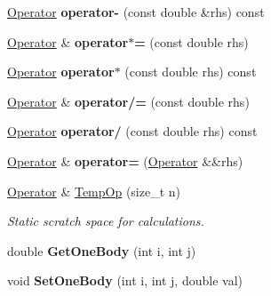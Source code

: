 \begin{DoxyCompactItemize}
\item 
\hyperlink{classOperator}{Operator} {\bfseries operator-\/} (const double \&rhs) const \hypertarget{classOperator_ab608309d2c25a2cabd0a65e9ac7dbc4d}{}\label{classOperator_ab608309d2c25a2cabd0a65e9ac7dbc4d}

\item 
\hyperlink{classOperator}{Operator} \& {\bfseries operator$\ast$=} (const double rhs)\hypertarget{classOperator_a9398ce826d8ef57e69a1aa776734080f}{}\label{classOperator_a9398ce826d8ef57e69a1aa776734080f}

\item 
\hyperlink{classOperator}{Operator} {\bfseries operator$\ast$} (const double rhs) const \hypertarget{classOperator_a0eeafc807e6ef6e3d30810f114e249bb}{}\label{classOperator_a0eeafc807e6ef6e3d30810f114e249bb}

\item 
\hyperlink{classOperator}{Operator} \& {\bfseries operator/=} (const double rhs)\hypertarget{classOperator_a53af250702ec7c48de5397b209ebc09e}{}\label{classOperator_a53af250702ec7c48de5397b209ebc09e}

\item 
\hyperlink{classOperator}{Operator} {\bfseries operator/} (const double rhs) const \hypertarget{classOperator_a60c6e3fa8da186a1183e540e6ff04421}{}\label{classOperator_a60c6e3fa8da186a1183e540e6ff04421}

\item 
\hyperlink{classOperator}{Operator} \& {\bfseries operator=} (\hyperlink{classOperator}{Operator} \&\&rhs)\hypertarget{classOperator_ab1d24f45c7e10139e41084c8dc7f34ec}{}\label{classOperator_ab1d24f45c7e10139e41084c8dc7f34ec}

\item 
\hyperlink{classOperator}{Operator} \& \hyperlink{classOperator_a868fc1cfa77af585baaefe7cbd7d76e5}{Temp\+Op} (size\+\_\+t n)\hypertarget{classOperator_a868fc1cfa77af585baaefe7cbd7d76e5}{}\label{classOperator_a868fc1cfa77af585baaefe7cbd7d76e5}

\begin{DoxyCompactList}\small\item\em Static scratch space for calculations. \end{DoxyCompactList}\item 
double {\bfseries Get\+One\+Body} (int i, int j)\hypertarget{classOperator_a34eb5fa0e6d415cd44e1a3034d1cf5c0}{}\label{classOperator_a34eb5fa0e6d415cd44e1a3034d1cf5c0}

\item 
void {\bfseries Set\+One\+Body} (int i, int j, double val)\hypertarget{classOperator_ae85aa3d8fdaeb3cb6266c3a4494e904b}{}\label{classOperator_ae85aa3d8fdaeb3cb6266c3a4494e904b}


\end{DoxyCompactItemize}

